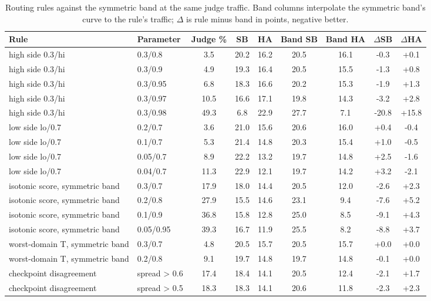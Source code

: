\begin{table}[!htbp]
\caption{Routing rules against the symmetric band at the same judge traffic. Band columns interpolate the symmetric band's curve to the rule's traffic; $\Delta$ is rule minus band in points, negative better.}
\label{tab:routealt}
\centering
\scriptsize
\setlength{\tabcolsep}{3pt}
\begin{tabular}{@{}llccccccc@{}}
\toprule
Rule & Parameter & Judge \% & SB & HA & Band SB & Band HA & $\Delta$SB & $\Delta$HA \\
\midrule
high side 0.3/hi & 0.3/0.8 & 3.5 & 20.2 & 16.2 & 20.5 & 16.1 & -0.3 & +0.1 \\
high side 0.3/hi & 0.3/0.9 & 4.9 & 19.3 & 16.4 & 20.5 & 15.5 & -1.3 & +0.8 \\
high side 0.3/hi & 0.3/0.95 & 6.8 & 18.3 & 16.6 & 20.2 & 15.3 & -1.9 & +1.3 \\
high side 0.3/hi & 0.3/0.97 & 10.5 & 16.6 & 17.1 & 19.8 & 14.3 & -3.2 & +2.8 \\
high side 0.3/hi & 0.3/0.98 & 49.3 & 6.8 & 22.9 & 27.7 & 7.1 & -20.8 & +15.8 \\
low side lo/0.7 & 0.2/0.7 & 3.6 & 21.0 & 15.6 & 20.6 & 16.0 & +0.4 & -0.4 \\
low side lo/0.7 & 0.1/0.7 & 5.3 & 21.4 & 14.8 & 20.3 & 15.4 & +1.0 & -0.5 \\
low side lo/0.7 & 0.05/0.7 & 8.9 & 22.2 & 13.2 & 19.7 & 14.8 & +2.5 & -1.6 \\
low side lo/0.7 & 0.04/0.7 & 11.3 & 22.9 & 12.1 & 19.7 & 14.2 & +3.2 & -2.1 \\
isotonic score, symmetric band & 0.3/0.7 & 17.9 & 18.0 & 14.4 & 20.5 & 12.0 & -2.6 & +2.3 \\
isotonic score, symmetric band & 0.2/0.8 & 27.9 & 15.5 & 14.6 & 23.1 & 9.4 & -7.6 & +5.2 \\
isotonic score, symmetric band & 0.1/0.9 & 36.8 & 15.8 & 12.8 & 25.0 & 8.5 & -9.1 & +4.3 \\
isotonic score, symmetric band & 0.05/0.95 & 39.3 & 16.7 & 11.9 & 25.5 & 8.2 & -8.8 & +3.7 \\
worst-domain T, symmetric band & 0.3/0.7 & 4.8 & 20.5 & 15.7 & 20.5 & 15.7 & +0.0 & +0.0 \\
worst-domain T, symmetric band & 0.2/0.8 & 9.1 & 19.7 & 14.8 & 19.7 & 14.8 & -0.1 & +0.0 \\
checkpoint disagreement & spread > 0.6 & 17.4 & 18.4 & 14.1 & 20.5 & 12.4 & -2.1 & +1.7 \\
checkpoint disagreement & spread > 0.5 & 18.3 & 18.3 & 14.1 & 20.6 & 11.8 & -2.3 & +2.3 \\

\end{tabular}
\end{table}
